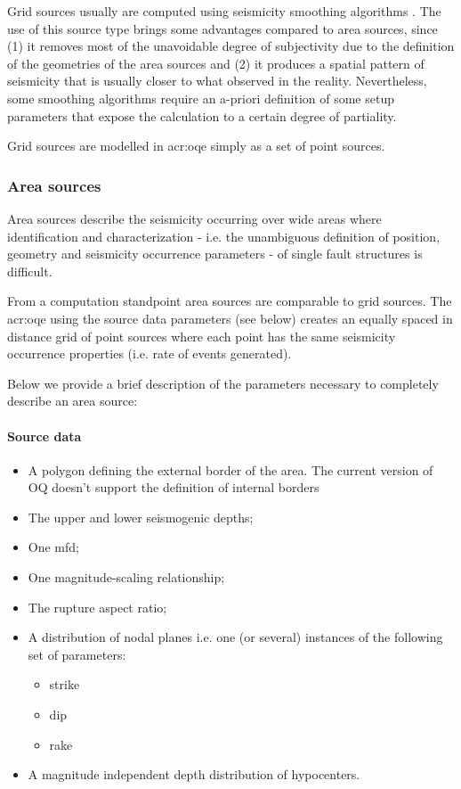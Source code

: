 Grid sources usually are computed using seismicity smoothing algorithms 
\citep[][amongst many others]{frankel1995,woo1996}. 
%
The use of this source type brings some advantages compared to area sources, 
since (1) it removes most of the unavoidable degree of subjectivity due to 
the definition of the geometries of the area sources and (2) it produces
a spatial pattern of seismicity that is usually closer to what observed in 
the reality. 
Nevertheless, some smoothing algorithms require an a-priori definition of 
some setup parameters that expose the calculation to a certain degree of 
partiality.

Grid sources are modelled in \gls{acr:oqe} simply as a set of point sources. 
\subsubsection{Area sources}
\label{hazard:seismic_source_types:areaSources}
%
Area sources describe the seismicity occurring over wide areas where  
identification and characterization - i.e. the unambiguous definition 
of position, geometry and seismicity occurrence parameters - of single 
fault structures is difficult. 

From a computation standpoint area sources are comparable to grid sources.
The \gls{acr:oqe} using the source data parameters (see below)  
creates an equally spaced in distance grid of point sources where
each point has the same seismicity occurrence properties (i.e. rate
of events generated).

Below we provide a brief description of the parameters necessary to 
completely describe an area source:
%
\paragraph{Source data}
\begin{itemize}
\item A polygon defining the external border of the area. 
The current version of OQ doesn't support the definition 
of internal borders
\item The upper and lower seismogenic depths;
\item One \gls{mfd};
\item One magnitude-scaling relationship;
\item The rupture aspect ratio;
\item A distribution of nodal planes i.e. one (or several) instances 
    of the following set of parameters:
\begin{itemize}
	\item strike
	\item dip
	\item rake
\end{itemize}
\item A magnitude independent depth distribution of hypocenters. 
\end{itemize}

